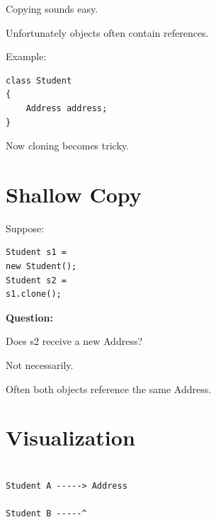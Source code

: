 \documentclass[11pt,a4paper]{book}
\begin{document}
Copying sounds easy.


Unfortunately objects often
contain references.


Example:

\begin{verbatim}
class Student
{
    Address address;
}
\end{verbatim}


Now cloning becomes tricky.


\section{Shallow Copy}

Suppose:

\begin{verbatim}
Student s1 =
new Student();
Student s2 =
s1.clone();
\end{verbatim}


\textbf{Question:}


Does s2 receive a new Address?


Not necessarily.


Often both objects reference
the same Address.


\section{Visualization}

\begin{verbatim}

Student A -----> Address

Student B -----^

\end{verbatim}
\end{document}
